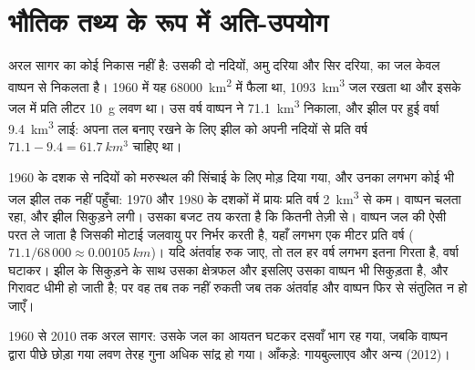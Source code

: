 \section{भौतिक तथ्य के रूप में अति-उपयोग}

अरल सागर का कोई निकास नहीं है: उसकी दो नदियों, अमु दरिया और
सिर दरिया, का जल केवल वाष्पन से निकलता है। 1960 में यह
\qty{68000}{km^2} में फैला था, \qty{1093}{km^3} जल रखता था और इसके जल में प्रति लीटर \qty{10}{g}
लवण था। उस वर्ष वाष्पन ने \qty{71.1}{km^3} निकाला, और झील पर हुई वर्षा
\qty{9.4}{km^3} लाई: अपना तल बनाए रखने के लिए झील को अपनी नदियों से
प्रति वर्ष $71.1 - 9.4 = \qty{61.7}{km^3}$ चाहिए था।

1960 के दशक से नदियों को मरुस्थल की सिंचाई के लिए मोड़ दिया गया, और उनका लगभग
कोई भी जल झील तक नहीं पहुँचा: 1970 और 1980 के दशकों में प्रायः
प्रति वर्ष \qty{2}{km^3} से कम। वाष्पन चलता रहा, और झील
सिकुड़ने लगी। उसका बजट तय करता है कि कितनी तेज़ी से। वाष्पन जल की ऐसी परत ले जाता है
जिसकी मोटाई जलवायु पर निर्भर करती है, यहाँ लगभग एक मीटर प्रति वर्ष
($71.1/68\,000 \approx \qty{0.00105}{km}$)। यदि अंतर्वाह रुक जाए, तो तल
हर वर्ष लगभग इतना गिरता है, वर्षा घटाकर। झील के सिकुड़ने के साथ उसका
क्षेत्रफल और इसलिए उसका वाष्पन भी सिकुड़ता है, और गिरावट धीमी हो जाती है; पर वह
तब तक नहीं रुकती जब तक अंतर्वाह और वाष्पन फिर से संतुलित न हो जाएँ।

\begin{omfigure}

{\small 1960 से 2010 तक अरल सागर: उसके जल का आयतन घटकर दसवाँ भाग
रह गया, जबकि वाष्पन द्वारा पीछे छोड़ा गया लवण तेरह गुना अधिक
सांद्र हो गया। आँकड़े: गायबुल्लाएव और अन्य (2012)।}
\end{omfigure}

